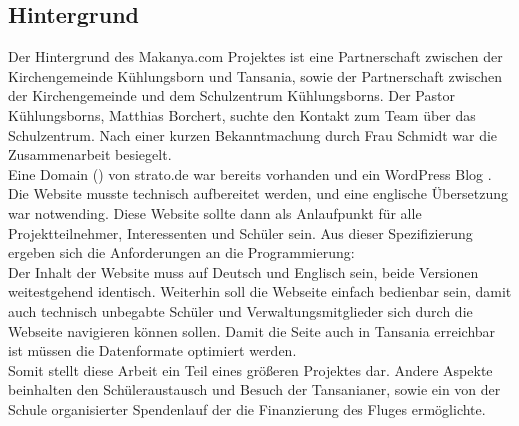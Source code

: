 \subsection{Hintergrund} %
Der Hintergrund des Makanya.com Projektes ist eine Partnerschaft
zwischen der Kirchengemeinde Kühlungsborn und Tansania,
sowie der Partnerschaft zwischen der Kirchengemeinde und dem Schulzentrum Kühlungsborns.
Der Pastor Kühlungsborns, Matthias Borchert,
suchte den Kontakt zum \jf Team über das Schulzentrum.
Nach einer kurzen Bekanntmachung durch Frau Schmidt war die Zusammenarbeit besiegelt.\\
Eine Domain () von strato.de war bereits vorhanden
und ein WordPress Blog .
Die Website musste technisch aufbereitet werden, und eine englische Übersetzung war notwending.
Diese Website sollte dann als Anlaufpunkt für alle Projektteilnehmer, Interessenten und Schüler sein.
Aus dieser Spezifizierung ergeben sich die Anforderungen an die Programmierung:\\
Der Inhalt der Website muss auf Deutsch und Englisch sein, beide Versionen weitestgehend identisch.
Weiterhin soll die Webseite einfach bedienbar sein,
damit auch technisch unbegabte Schüler und Verwaltungsmitglieder sich durch die Webseite navigieren können sollen.
Damit die Seite auch in Tansania erreichbar ist müssen die Datenformate optimiert werden.\\
Somit stellt diese Arbeit ein Teil eines größeren Projektes dar.
Andere Aspekte beinhalten den Schüleraustausch und Besuch der Tansanianer,
sowie ein von der Schule organisierter Spendenlauf der die Finanzierung des Fluges ermöglichte.

